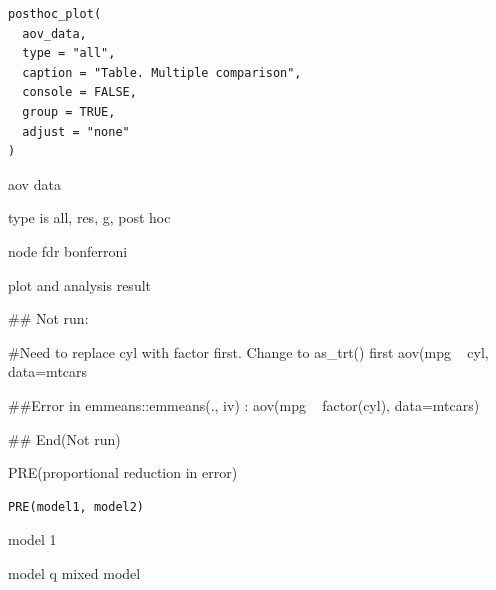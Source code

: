 \documentclass[a4paper]{book}
\begin{document}
%
\begin{Usage}
\begin{verbatim}
posthoc_plot(
  aov_data,
  type = "all",
  caption = "Table. Multiple comparison",
  console = FALSE,
  group = TRUE,
  adjust = "none"
)
\end{verbatim}
\end{Usage}
%
\begin{Arguments}
\begin{ldescription}
\item[\code{aov\_data}] aov data

\item[\code{type}] type is all, res, g, post hoc

\item[\code{adjust}] node fdr bonferroni
\end{ldescription}
\end{Arguments}
%
\begin{Value}
plot and analysis result
\end{Value}
%
\begin{Examples}
\begin{ExampleCode}

\#\# Not run: 

#Need to replace cyl with factor first. Change to as_trt() first
aov(mpg ~ cyl, data=mtcars %

##Error in emmeans::emmeans(., iv) :
aov(mpg ~ factor(cyl), data=mtcars)%


## End(Not run)

\end{ExampleCode}
\end{Examples}
%
\begin{Description}
PRE(proportional reduction in error)
\end{Description}
%
\begin{Usage}
\begin{verbatim}
PRE(model1, model2)
\end{verbatim}
\end{Usage}
%
\begin{Arguments}
\begin{ldescription}
\item[\code{model1}] model 1

\item[\code{model2}] model q mixed model
\end{ldescription}
\end{Arguments}
\end{document}
